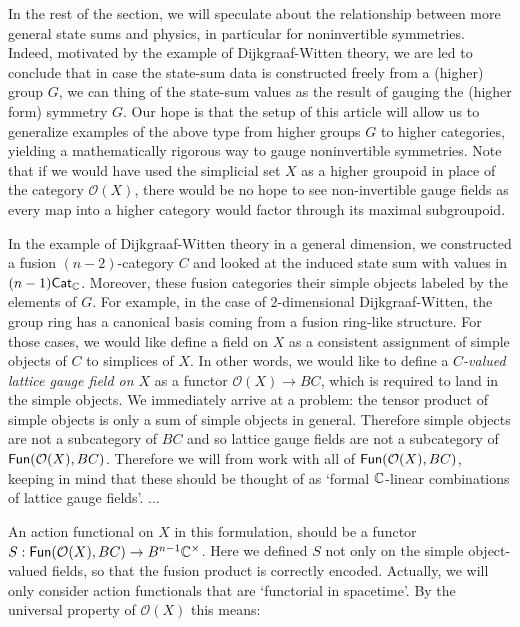 In the rest of the section, we will speculate about the relationship between more general state sums and physics, in particular for noninvertible symmetries.
Indeed, motivated by the example of Dijkgraaf-Witten theory, we are led to conclude that in case the state-sum data is constructed freely from a (higher) group $G$, we can thing of the state-sum values as the result of gauging the (higher form) symmetry $G$.
Our hope is that the setup of this article will allow us to generalize examples of the above type from higher groups $G$ to higher categories, yielding a mathematically rigorous way to gauge noninvertible symmetries.
Note that if we would have used the simplicial set $X$ as a higher groupoid in place of the category $\mathcal{O}(X)$, there would be no hope to see non-invertible gauge fields as every map into a higher category would factor through its maximal subgroupoid.

In the example of Dijkgraaf-Witten theory in a general dimension, we constructed a fusion $(n-2)$-category $C$ and looked at the induced state sum with values in $(n-1)\mathsf{Cat}_{\mathbb{C}}$.
Moreover, these fusion categories their simple objects labeled by the elements of $G$.
For example, in the case of $2$-dimensional Dijkgraaf-Witten, the group ring has a canonical basis coming from a fusion ring-like structure. 
For those cases, we would like define a field on $X$ as a consistent assignment of simple objects of $C$ to simplices of $X$.
In other words, we would like to define a \emph{$C$-valued lattice gauge field on $X$} as a functor $\mathcal{O}(X) \to BC$, which is required to land in the simple objects. 
We immediately arrive at a problem: the tensor product of simple objects is only a sum of simple objects in general. 
Therefore simple objects are not a subcategory of $BC$ and so lattice gauge fields are not a subcategory of $\mathsf{Fun}(\mathcal{O}(X), BC)$.
Therefore we will from work with all of $\mathsf{Fun}(\mathcal{O}(X), BC)$, keeping in mind that these should be thought of as `formal $\mathbb{C}$-linear combinations of lattice gauge fields'.
...

An action functional on $X$ in this formulation, should be a functor $S: \mathsf{Fun}(\mathcal{O}(X), BC) \to B^{n-1} \mathbb{C}^\times$.
Here we defined $S$ not only on the simple object-valued fields, so that the fusion product is correctly encoded.
Actually, we will only consider action functionals that are `functorial in spacetime'.
By the universal property of $\mathcal{O}(X)$ this means:

